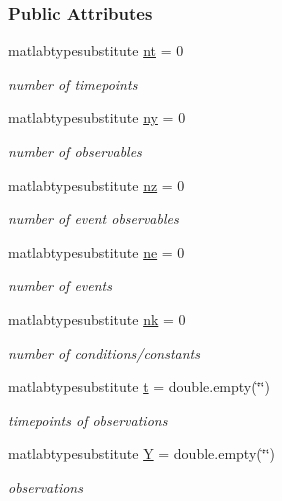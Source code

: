 \subsubsection*{Public Attributes}
\begin{DoxyCompactItemize}
\item 
matlabtypesubstitute \mbox{\hyperlink{classamidata_a03cfcdd983bff4aef77268b785b28345}{nt}} = 0
\begin{DoxyCompactList}\small\item\em number of timepoints \end{DoxyCompactList}\item 
matlabtypesubstitute \mbox{\hyperlink{classamidata_a289ca425eb368f1d582b6be2be0d3dfc}{ny}} = 0
\begin{DoxyCompactList}\small\item\em number of observables \end{DoxyCompactList}\item 
matlabtypesubstitute \mbox{\hyperlink{classamidata_a79f11413e5bfe18a0e71e17574399ad5}{nz}} = 0
\begin{DoxyCompactList}\small\item\em number of event observables \end{DoxyCompactList}\item 
matlabtypesubstitute \mbox{\hyperlink{classamidata_aaca25d624cf863f786f67137c62aa11d}{ne}} = 0
\begin{DoxyCompactList}\small\item\em number of events \end{DoxyCompactList}\item 
matlabtypesubstitute \mbox{\hyperlink{classamidata_afd6bea572754e0c3c320664bdccf0200}{nk}} = 0
\begin{DoxyCompactList}\small\item\em number of conditions/constants \end{DoxyCompactList}\item 
matlabtypesubstitute \mbox{\hyperlink{classamidata_aaccc9105df5383111407fd5b41255e23}{t}} = double.\+empty(\char`\"{}\char`\"{})
\begin{DoxyCompactList}\small\item\em timepoints of observations \end{DoxyCompactList}\item 
matlabtypesubstitute \mbox{\hyperlink{classamidata_a0867f43e27585e019c13f7f4b7c4ab6b}{Y}} = double.\+empty(\char`\"{}\char`\"{})
\begin{DoxyCompactList}\small\item\em observations \end{DoxyCompactList}\item 

\end{DoxyCompactItemize}
